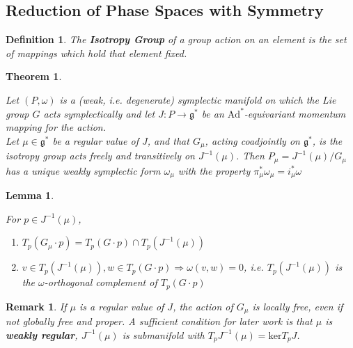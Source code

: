 \documentclass{article}
\newtheorem{thm}{Theorem}
\newtheorem{defn}{Definition}
\newtheorem{rmk}{Remark}
\newtheorem{lem}{Lemma}
\begin{document}
\subsection{Reduction of Phase Spaces with Symmetry}

\begin{defn}

The \textbf{Isotropy Group} of a group action on an element is the set of mappings which hold that element fixed.

\end{defn}

\begin{thm} \label{thm:1}

Let $(P,\omega)$ is a (weak, i.e. degenerate) symplectic manifold on which the Lie group $G$ acts symplectically and let $J:P \to \mathfrak{g}^*$ be an $\mathrm{Ad}^*$-equivariant momentum mapping for the action. \\
\indent Let $\mu \in \mathfrak{g}^*$ be a regular value of $J$, and that $G_{\mu}$, acting coadjointly on $\mathfrak{g}^*$, is the isotropy group acts freely and transitively on $J^{-1}(\mu)$. Then $P_{\mu} = J^{-1}(\mu) / G_{\mu} $ has a unique weakly symplectic form $\omega_{\mu}$ with the property
$\pi^*_{\mu}\omega_{\mu} = i^*_{\mu} \omega$
\end{thm}

\begin{lem}\label{lem:1}

For $p \in J^{-1}(\mu)$,
\begin{enumerate}
    \item $T_p(G_\mu \cdot p) = T_p(G \cdot p) \cap T_p(J^{-1}(\mu))$
    \item $v \in T_p(J^{-1}(\mu)), w \in T_p(G \cdot p) \Rightarrow \omega(v,w)=0$, i.e. $T_p(J^{-1}(\mu))$ is the $\omega$-orthogonal complement of $T_p(G \cdot p)$
\end{enumerate}
\end{lem}

\begin{rmk}

If $\mu$ is a regular value of $J$, the action of $G_{\mu}$ is locally free, even if not globally free and proper. A sufficient condition for later work is that $\mu$ is \textbf{weakly regular}, $J^{-1}(\mu)$ is submanifold with $T_pJ^{-1}(\mu) = \mathrm{ker}T_p J$.
\end{rmk}
\end{document}
